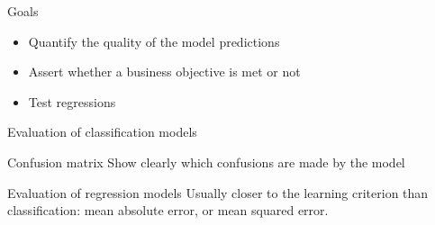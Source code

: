 \begin{frame}{Goals}
  \begin{itemize}
    \item Quantify the quality of the model predictions
    \item Assert whether a business objective is met or not
    \item Test regressions
  \end{itemize}
\end{frame}

\begin{frame}{Evaluation of classification models}
\end{frame}

\begin{frame}{Confusion matrix}
  Show clearly which confusions are made by the model
\end{frame}

\begin{frame}{Evaluation of regression models}
  Usually closer to the learning criterion than classification: mean absolute error, or mean squared error.
\end{frame}
